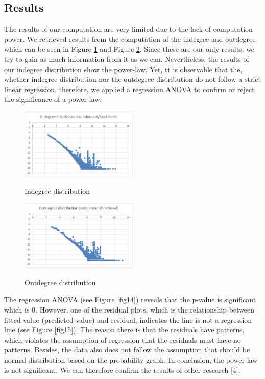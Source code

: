 \subsection{Results}
The results of our computation are very limited due to the lack of computation power. We retrieved results from the computation of the indegree and outdegree which can be seen in Figure \ref{fig12} and Figure \ref{fig13}. Since these are our only results, we try to gain as much information from it as we can. Nevertheless, the results of our indegree distribution show the power-law. Yet, tt is observable that the, whether indegree distribution nor the outdegree distribution do not follow a strict linear regression, therefore, we applied  a regression ANOVA to confirm or reject the significance of a power-law.

\begin{figure}[h]
	\begin{center}
		\label{fig12}		
		\includegraphics[width=0.5\textwidth]{fig12}	
		\caption{Indegree distribution}	
	\end{center}
\end{figure}

\begin{figure}[h]
	\begin{center}
		\label{fig13}		
		\includegraphics[width=0.5\textwidth]{fig13}	
		\caption{Outdegree distribution}	
	\end{center}
\end{figure}

The regression ANOVA (see Figure \ref{fig14}) reveals that the p-value is significant which is 0. However, one of the residual plots, which is the relationship between fitted value (predicted value) and residual, indicates the line is not a regression line (see Figure \ref{fig15}). The reason there is that the residuals have patterns, which violates the assumption of regression that the residuals must have no patterns. Besides, the data also does not follow the assumption that should be normal distribution based on the probability graph. In conclusion, the power-law is not significant. We can therefore confirm the results of other research [4].


